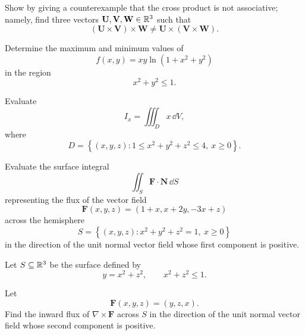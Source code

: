 \begin{problem}
Show by giving a counterexample that the cross product is not associative; namely, find three vectors $\mathbf U,\mathbf V,\mathbf W\in\mathbb{R}^3$ such that
\[
(\mathbf U\times\mathbf V)\times\mathbf W
\ne
\mathbf U\times(\mathbf V\times\mathbf W).
\]
\end{problem}

\begin{problem}
Determine the maximum and minimum values of
\[
f(x,y)=xy\ln(1+x^2+y^2)
\]
in the region
\[
x^2+y^2\le1.
\]
\end{problem}

\begin{problem}
Evaluate
\[
I_x=\iiint_D x\,\dd V,
\]
where
\[
D=\left\{(x,y,z):1\le x^2+y^2+z^2\le4,\ x\ge0\right\}.
\]
\end{problem}

\begin{problem}
Evaluate the surface integral
\[
\iint_S \mathbf F\cdot\mathbf N\,\dd S
\]
representing the flux of the vector field
\[
\mathbf F(x,y,z)=(1+x,x+2y,-3x+z)
\]
across the hemisphere
\[
S=\left\{(x,y,z):x^2+y^2+z^2=1,\ x\ge0\right\}
\]
in the direction of the unit normal vector field whose first component is positive.
\end{problem}

\begin{problem}
Let $S\subseteq\mathbb{R}^3$ be the surface defined by
\[
y=x^2+z^2,
\qquad x^2+z^2\le1.
\]

\begin{center}
\end{center}

Let
\[
\mathbf F(x,y,z)=(y,z,x).
\]
Find the inward flux of $\nabla\times\mathbf F$ across $S$ in the direction of the unit normal vector field whose second component is positive.
\end{problem}


